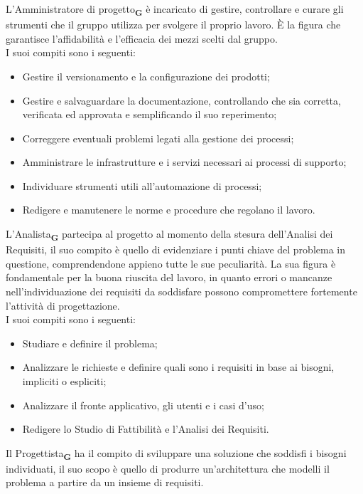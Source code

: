 L’Amministratore di progetto\textsubscript{\textbf{G}} è incaricato di gestire, controllare e curare gli strumenti che il gruppo utilizza per svolgere il proprio lavoro. È la figura che garantisce l’affidabilità e l’efficacia dei mezzi scelti dal gruppo.\\
I suoi compiti sono i seguenti:
\begin {itemize}
    \item Gestire il versionamento e la configurazione dei prodotti; 
    \item Gestire e salvaguardare la documentazione, controllando che sia corretta, verificata ed approvata e semplificando il suo reperimento;
    \item Correggere eventuali problemi legati alla gestione dei processi;
    \item Amministrare le infrastrutture e i servizi necessari ai processi di supporto;
    \item Individuare strumenti utili all'automazione di processi;
    \item Redigere e manutenere le norme e procedure che regolano il lavoro.
\end {itemize}
L’Analista\textsubscript{\textbf{G}} partecipa al progetto al momento della stesura dell’Analisi dei Requisiti, il suo compito è quello di evidenziare i punti chiave del problema in questione, comprendendone appieno tutte le sue peculiarità. La sua figura è fondamentale per la buona riuscita del lavoro, in quanto errori o mancanze nell’individuazione dei requisiti da soddisfare possono compromettere fortemente l'attività di progettazione.\\
I suoi compiti sono i seguenti:
\begin {itemize}
    \item Studiare e definire il problema; 
    \item Analizzare le richieste e definire quali sono i requisiti in base ai bisogni, impliciti o espliciti;
    \item Analizzare il fronte applicativo, gli utenti e i casi d’uso;
    \item Redigere lo Studio di Fattibilità e l’Analisi dei Requisiti.
\end {itemize}
Il Progettista\textsubscript{\textbf{G}} ha il compito di sviluppare una soluzione che soddisfi i bisogni individuati, il suo scopo è quello di produrre un’architettura che modelli il problema a partire da un insieme di requisiti.\\
